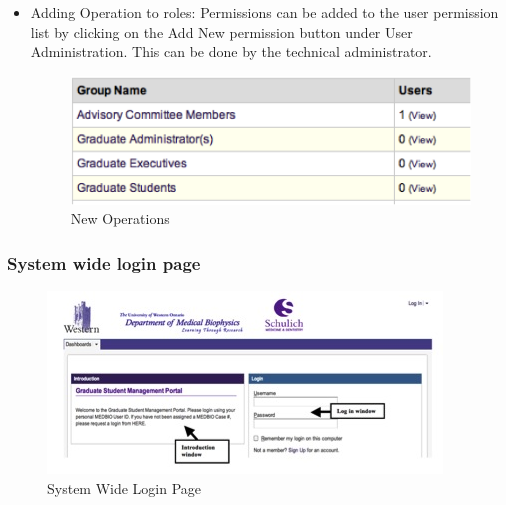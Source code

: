 \documentclass[11pt,a4paper]{report}
\begin{document}
\begin{itemize}
\begin{itemize}
\item Adding Operation to roles: Permissions can be added to the user permission list by clicking on the Add New permission button under User Administration. This can be done by the technical administrator.

\begin{figure}[htp]
\centering
\includegraphics[scale=1]{diagrams/HTMLTemplating/Figure9.png}
\caption{New Operations}
\label{fig:NewPermission}
\end{figure}


\end{itemize}
\end{itemize}

\subsubsection{System wide login page}

\begin{figure}[htp]
\centering
\includegraphics[scale=1]{diagrams/HTMLTemplating/Figure1.jpg}
\caption{System Wide Login Page}
\label{fig:SystemWideLogin}
\end{figure}
\end{document}
